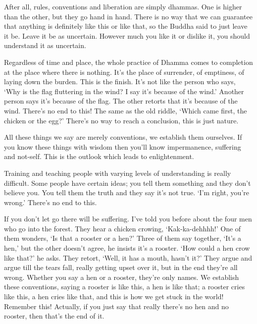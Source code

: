 After all, rules, conventions and liberation are simply dhammas. One is higher than the other, but they go hand in hand. There is no way that we can guarantee that anything is definitely like this or like that, so the Buddha said to just leave it be. Leave it be as uncertain. However much you like it or dislike it, you should understand it as uncertain. 

Regardless of time and place, the whole practice of Dhamma comes to completion at the place where there is nothing. It's the place of surrender, of emptiness, of laying down the burden. This is the finish. It's not like the person who says, `Why is the flag fluttering in the wind? I say it's because of the wind.' Another person says it's because of the flag. The other retorts that it's because of the wind. There's no end to this! The same as the old riddle, `Which came first, the chicken or the egg?' There's no way to reach a conclusion, this is just nature. 

All these things we say are merely conventions, we establish them our\-selves. If you know these things with wisdom then you'll know impermanence, suffering and not-self. This is the outlook which leads to enlightenment.

Training and teaching people with varying levels of understanding is really difficult. Some people have certain ideas; you tell them something and they don't believe you. You tell them the truth and they say it's not true. `I'm right, you're wrong.' There's no end to this. 

If you don't let go there will be suffering. I've told you before about the four men who go into the forest. They hear a chicken crowing, `Kak-ka-dehhhh!' One of them wonders, `Is that a rooster or a hen?' Three of them say together, `It's a hen,' but the other doesn't agree, he insists it's a rooster. `How could a hen crow like that?' he asks. They retort, `Well, it has a mouth, hasn't it?' They argue and argue till the tears fall, really getting upset over it, but in the end they're all wrong. Whether you say a hen or a rooster, they're only names. We establish these conventions, saying a rooster is like this, a hen is like that; a rooster cries like this, a hen cries like that, and this is how we get stuck in the world! Remember this! Actually, if you just say that really there's no hen and no rooster, then that's the end of it.


